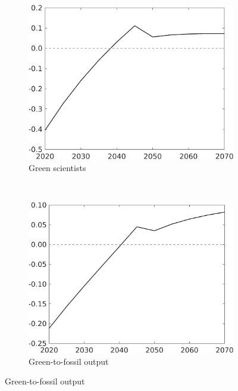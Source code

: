 \begin{figure}[h!!!]
\vspace{3mm}
	\begin{subfigure}{0.4\textwidth}
	\caption{Green scientists}
	\includegraphics[width=1\textwidth]{../../codding_model/own_basedOnFried/optimalPol_010922_revision/figures/all_13Sept22_Tplus30/sg_OPT_T_NoTaus_COMPtaulPer_regime4_spillover0_knspil0_noskill0_sep0_xgrowth0_PV1_etaa0.79.png}
\end{subfigure}
\begin{minipage}[]{0.1\textwidth}
	\
\end{minipage}
\begin{subfigure}{0.4\textwidth}
\caption{Green-to-fossil output}
\includegraphics[width=1\textwidth]{../../codding_model/own_basedOnFried/optimalPol_010922_revision/figures/all_13Sept22_Tplus30/GFF_OPT_T_NoTaus_COMPtaulPer_regime4_spillover0_knspil0_noskill0_sep0_xgrowth0_PV1_etaa0.79.png}
\end{subfigure}
\end{figure} 

